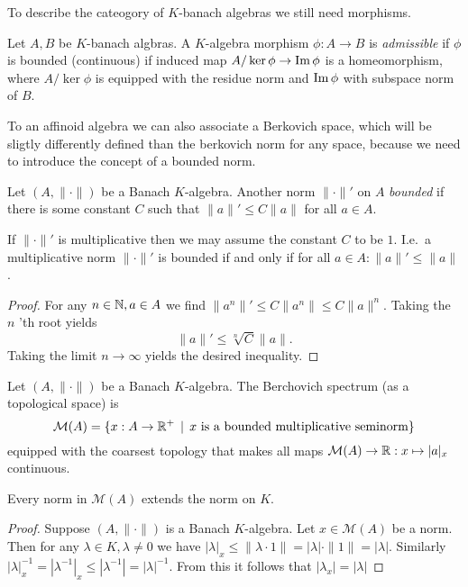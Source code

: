 To describe the cateogory of $K$-banach algebras we still need morphisms.
\begin{definition}
	Let $A, B$ be $K$-banach algbras. 
	A $K$-algebra morphism $\phi: A \to B$ is \emph{admissible} if $\phi$ is bounded (continuous) if induced map $A / \ker \phi \to \operatorname{Im} \phi$ is a homeomorphism, where $A / \ker \phi$ is equipped with the residue norm and $\operatorname{Im} \phi$ with subspace norm of $B$. 
\end{definition}


To an affinoid algebra we can also associate a Berkovich space, which will be sligtly differently defined than the berkovich norm for any space, because we need to introduce the concept of a bounded norm.

\begin{definition}
	Let $(A, \|\cdot \|)$ be a Banach $K$-algebra. Another norm $\|\cdot \|'$ on $A$ \emph{bounded}  if there is some constant $C$ such that  $\|a\|' \le C \|a\|$ for all $a \in A$. 
\end{definition}

\begin{remark}
	If $\|\cdot \|'$ is multiplicative then we may assume the constant $C$ to be $1$. 
	I.e.\ a multiplicative norm $\|\cdot \|'$ is bounded if and only if  for all $a \in A: \|a\|' \le \|a\|$. 
\end{remark}
\begin{proof}
	For any $n \in \mathbb{N}, a \in A$ we find $\|a^{n}\|' \le C \|a^{n}\| \le C \|a\|^{n}$. 
	Taking the $n$ 'th root yields \[
		\|a\|' \le \sqrt[n]{C} \|a\|
	.\] 
	Taking the limit $n \to \infty$ yields the desired inequality. 
\end{proof}

\begin{definition}\label{def:spectrum_banach_algebra}
	Let $(A, \|\cdot \|)$ be a Banach $K$-algebra. 
	The Berchovich spectrum (as a topological space) is \[
		\mathcal{M} (A) = \{x: A \to\R^{+} \st x \text{ is a bounded multiplicative seminorm}\} 
	\] 
	equipped with the coarsest topology that makes all maps $\mathcal{M} (A) \to \mathbb{R}: x \mapsto |a|_x$ continuous. 
\end{definition}

\begin{proposition}\label{prop:norm_spectrum_extends_base_field}
	Every norm in $\mathcal{M} (A)$ extends the norm on $K$. 
\end{proposition}
\begin{proof}
	Suppose $(A, \|\cdot \|)$ is a Banach $K$-algebra. 
	Let $x \in \mathcal{M} (A)$ be a norm. 
	Then for any $\lambda \in K, \lambda \ne 0$ we have $|\lambda|_x \le  \|\lambda\cdot 1\| = |\lambda| \cdot \|1\| = |\lambda|$. 
	Similarly $|\lambda|_x^{-1} = |\lambda^{-1}|_x  \le |\lambda^{-1}| = |\lambda|^{-1}$. 
	From this it follows that $|\lambda_x| = |\lambda|$
\end{proof}


